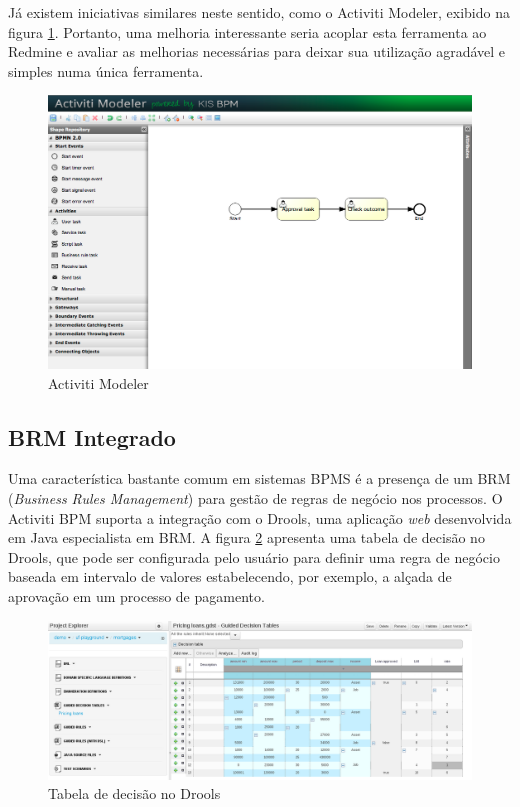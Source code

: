 Já existem iniciativas similares neste sentido, como o Activiti Modeler\cite{activiti_modeler}, exibido na figura \ref{fig:activiti_modeler}. Portanto, uma melhoria interessante seria acoplar esta ferramenta ao Redmine e avaliar as melhorias necessárias para deixar sua utilização agradável e simples numa única ferramenta.

\begin{figure}[H]
\centering
\includegraphics[width=1\textwidth]{imagens/activiti_modeler.png}
\caption{Activiti Modeler}
\label{fig:activiti_modeler}
\end{figure}

\subsection{BRM Integrado}

Uma característica bastante comum em sistemas BPMS é a presença de um BRM (\textit{Business Rules Management}) para gestão de regras de negócio nos processos. O Activiti BPM suporta a integração com o Drools, uma aplicação \textit{web} desenvolvida em Java especialista em BRM. A figura \ref{fig:drools} apresenta uma tabela de decisão no Drools, que pode ser configurada pelo usuário para definir uma regra de negócio baseada em intervalo de valores estabelecendo, por exemplo, a alçada de aprovação em um processo de pagamento.

\begin{figure}[H]
\centering
\includegraphics[width=1\textwidth]{imagens/drools_decision_table.png}
\caption{Tabela de decisão no Drools}
\label{fig:drools}
\end{figure}

